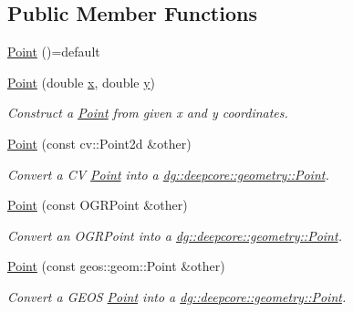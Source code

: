 \subsection*{Public Member Functions}
\begin{DoxyCompactItemize}
\item 
\hyperlink{structdg_1_1deepcore_1_1geometry_1_1_point_a31cceed03dd6966b9a1a6bf77a4d2901}{Point} ()=default
\item 
\hyperlink{structdg_1_1deepcore_1_1geometry_1_1_point_a57e68e0500faaf31d596e2bed4734b88}{Point} (double \hyperlink{structdg_1_1deepcore_1_1geometry_1_1_point_aa279ff5fe5e1aa8c6f0a461a21791569}{x}, double \hyperlink{structdg_1_1deepcore_1_1geometry_1_1_point_a34ee2d8d66009ad7128a7ef4dd97d190}{y})
\begin{DoxyCompactList}\small\item\em Construct a \hyperlink{structdg_1_1deepcore_1_1geometry_1_1_point}{Point} from given x and y coordinates. \end{DoxyCompactList}\item 
\hyperlink{structdg_1_1deepcore_1_1geometry_1_1_point_a8ac1663d11019a17aa709506ac4203cb}{Point} (const cv\+::\+Point2d \&other)
\begin{DoxyCompactList}\small\item\em Convert a CV \hyperlink{structdg_1_1deepcore_1_1geometry_1_1_point}{Point} into a \hyperlink{structdg_1_1deepcore_1_1geometry_1_1_point}{dg\+::deepcore\+::geometry\+::\+Point}. \end{DoxyCompactList}\item 
\hyperlink{structdg_1_1deepcore_1_1geometry_1_1_point_a0dc458b4cab66a05764382be05d486bb}{Point} (const O\+G\+R\+Point \&other)
\begin{DoxyCompactList}\small\item\em Convert an O\+G\+R\+Point into a \hyperlink{structdg_1_1deepcore_1_1geometry_1_1_point}{dg\+::deepcore\+::geometry\+::\+Point}. \end{DoxyCompactList}\item 
\hyperlink{structdg_1_1deepcore_1_1geometry_1_1_point_adb464c08675174939fbba8871e9c4dbd}{Point} (const geos\+::geom\+::\+Point \&other)
\begin{DoxyCompactList}\small\item\em Convert a G\+E\+OS \hyperlink{structdg_1_1deepcore_1_1geometry_1_1_point}{Point} into a \hyperlink{structdg_1_1deepcore_1_1geometry_1_1_point}{dg\+::deepcore\+::geometry\+::\+Point}. \end{DoxyCompactList}\item 

\end{DoxyCompactItemize}
